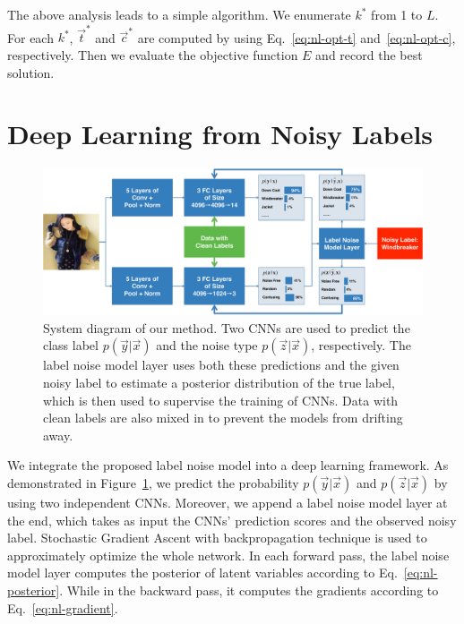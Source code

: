 The above analysis leads to a simple algorithm. We enumerate $k^*$ from 1 to $L$. For each $k^*$, $\vec{t}^*$ and $\vec{c}^*$ are computed by using Eq.~\eqref{eq:nl-opt-t} and~\eqref{eq:nl-opt-c}, respectively. Then we evaluate the objective function $E$ and record the best solution.




\section{Deep Learning from Noisy Labels} %
\label{sec:nl-deep-learning-from-noisy-labels}

\begin{figure}
\begin{center}
\includegraphics[width=1.0\linewidth]{figures/noisy_labels/diagram.pdf}
\end{center}
\caption{System diagram of our method. Two CNNs are used to predict the class label $p(\vec{y}|\vec{x})$ and the noise type $p(\vec{z}|\vec{x})$, respectively. The label noise model layer uses both these predictions and the given noisy label to estimate a posterior distribution of the true label, which is then used to supervise the training of CNNs. Data with clean labels are also mixed in to prevent the models from drifting away.}
\label{fig:nl-framework}
\end{figure}

We integrate the proposed label noise model into a deep learning framework. As demonstrated in Figure~\ref{fig:nl-framework}, we predict the probability $p(\vec{y}|\vec{x})$ and $p(\vec{z}|\vec{x})$ by using two independent CNNs. Moreover, we append a label noise model layer at the end, which takes as input the CNNs' prediction scores and the observed noisy label. Stochastic Gradient Ascent with backpropagation technique is used to approximately optimize the whole network. In each forward pass, the label noise model layer computes the posterior of latent variables according to Eq.~\eqref{eq:nl-posterior}. While in the backward pass, it computes the gradients according to Eq.~\eqref{eq:nl-gradient}.

